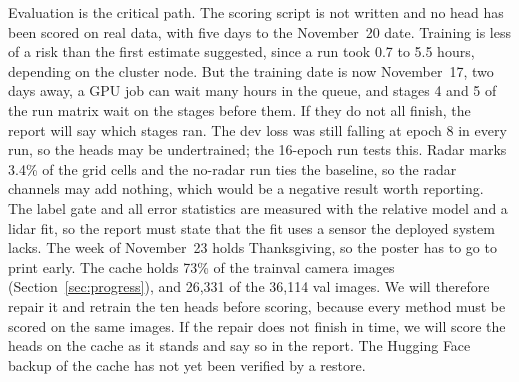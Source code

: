 Evaluation is the critical path. The scoring script is not written and no head has been scored on real data, with five days to the November~20 date. Training is less of a risk than the first estimate suggested, since a run took 0.7 to 5.5 hours, depending on the cluster node. But the training date is now November~17, two days away, a GPU job can wait many hours in the queue, and stages 4 and 5 of the run matrix wait on the stages before them. If they do not all finish, the report will say which stages ran. The dev loss was still falling at epoch 8 in every run, so the heads may be undertrained; the 16-epoch run tests this. Radar marks 3.4\% of the grid cells and the no-radar run ties the baseline, so the radar channels may add nothing, which would be a negative result worth reporting. The label gate and all error statistics are measured with the relative model and a lidar fit, so the report must state that the fit uses a sensor the deployed system lacks. The week of November~23 holds Thanksgiving, so the poster has to go to print early. The cache holds 73\% of the trainval camera images (Section~\ref{sec:progress}), and 26,331 of the 36,114 val images. We will therefore repair it and retrain the ten heads before scoring, because every method must be scored on the same images. If the repair does not finish in time, we will score the heads on the cache as it stands and say so in the report. The Hugging Face backup of the cache has not yet been verified by a restore.
